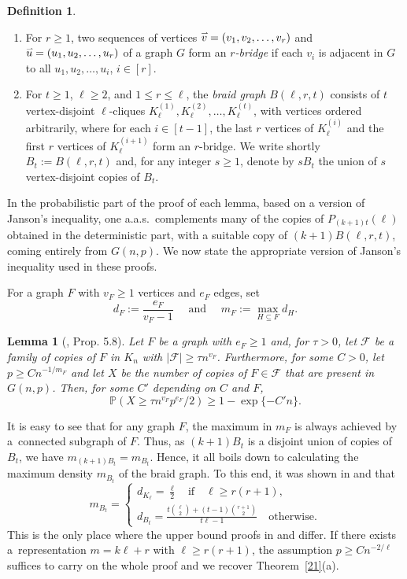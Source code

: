 \documentclass[reqno, 12pt]{amsart}
\numberwithin{equation}{section}
\numberwithin{figure}{section}
\theoremstyle{plain}
\newtheorem{lemma}[thm]{Lemma}
\theoremstyle{definition}
\newtheorem{dfn}[thm]{Definition}
\newcommand{\seq}[1]{\accentset{\rightharpoonup}{#1}}
\begin{document}
\newpage

\begin{dfn}\label{bra}~
\begin{enumerate}
    \item[(a)] For $r\ge1$, two sequences of vertices $\seq{v} = (v_1, v_2, \ldots, v_r)$ and $\seq{u} = (u_1, u_2, \ldots, u_r)$ of a graph $G$ form an \emph{$r$-bridge} if each $v_i$ is adjacent in $G$ to all $u_1, u_2, \ldots, u_{i}$, $i \in [r]$.
    \item[(b)]	For $t\ge1$, $\ell\ge2$, and $1\le r\le\ell$, the \emph{braid graph} $B(\ell,r,t)$ consists of $t$ vertex-disjoint $\ell$-cliques $K_\ell^{(1)},K_\ell^{(2)},\ldots,K_\ell^{(t)}$, with vertices ordered arbitrarily,  where for each $i\in[t-1]$, the last $r$ vertices of $K_\ell^{(i)}$ and the first $r$ vertices of $K_\ell^{(i+1)}$ form an $r$-bridge. We write shortly $B_t:=B(\ell,r,t)$ and, for any integer $s\geq 1$, denote by $sB_t$ the union of $s$ vertex-disjoint copies of $B_t$.
\end{enumerate}
\end{dfn}

In the probabilistic part of the proof of each lemma, based on a version of Janson's inequality, one a.a.s.~complements many of the copies of $P_{(k+1)t}(\ell)$ obtained in the deterministic part, with a suitable copy of $(k+1)B(\ell,r,t)$, coming entirely from $G(n,p)$. We now state the appropriate version of Janson's inequality used in these proofs.

For a graph $F$ with $v_F\ge1$ vertices and $e_F$ edges, set
\[d_F:=\frac{e_F}{v_F-1} \quad \text{ and } \quad m_F:=\max_{H\subseteq F}d_H.\]

\begin{lemma}[\cite{ADRRS}, Prop. 5.8]
Let $F$ be a graph with $e_F\ge1$ and, for $\tau>0$, let $\mathcal F$ be a family of copies of $F$ in $K_n$ with $|\mathcal F|\ge\tau n^{v_F}$. Furthermore, for some $C>0$, let $p\ge Cn^{-1/m_F}$ and let $X$ be the number of copies of $F\in\mathcal F$ that are present in $G(n,p)$.  Then, for some $C'$ depending on $C$ and $F$,
\[
\mathbb P(X \ge\tau n^{v_F}p^{e_F}/2)\ge1-\exp\{-C'n\}.
\]
\end{lemma}

It is easy to see that for any graph $F$, the maximum in $m_F$ is always achieved by a~connected subgraph of $F$. Thus, as $(k+1)B_t$ is a disjoint union of copies of $B_t$, we have $m_{(k+1)B_t}=m_{B_t}$.
Hence, it all boils down to calculating the maximum density $m_{B_t}$ of the braid graph. To this end, it was shown in \cite[proof of Prop. 5.8]{ADRRS} and \cite[Prop. 4.3]{ADR} that
\[
m_{B_t}= \begin{cases}
    d_{K_\ell}=\frac{\ell}2\quad\mbox{if}\quad \ell\ge r(r+1),\\ d_{B_t} = \frac{t{\ell\choose 2}+(t-1){r+1\choose 2}}{t\ell-1}\quad\mbox{otherwise.}
\end{cases}
\]
This is the only place where the upper bound proofs in \cite{ADRRS} and \cite{ADR} differ. If there exists a~representation $m=k\ell+r$ with $\ell\ge r(r+1)$, the assumption $p\ge Cn^{-2/\ell}$ suffices to carry on the whole proof and we recover Theorem~\ref{21}(a).
\end{document}
